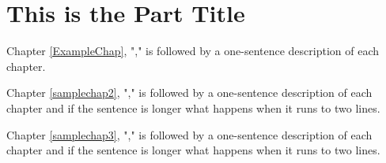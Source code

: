 \part{This is the Part Title}
\vspace*{4pt}
\sffamily %

\noindent Chapter \ref{ExampleChap}, ","  is followed by a one-sentence description of each chapter. 

Chapter \ref{samplechap2}, ","  is followed by a one-sentence description of each chapter and if the sentence is longer what happens when it runs to two lines.

Chapter \ref{samplechap3}, "," is followed by a one-sentence description of each chapter and if the sentence is longer what happens when it runs to two lines. 

\normalfont %




